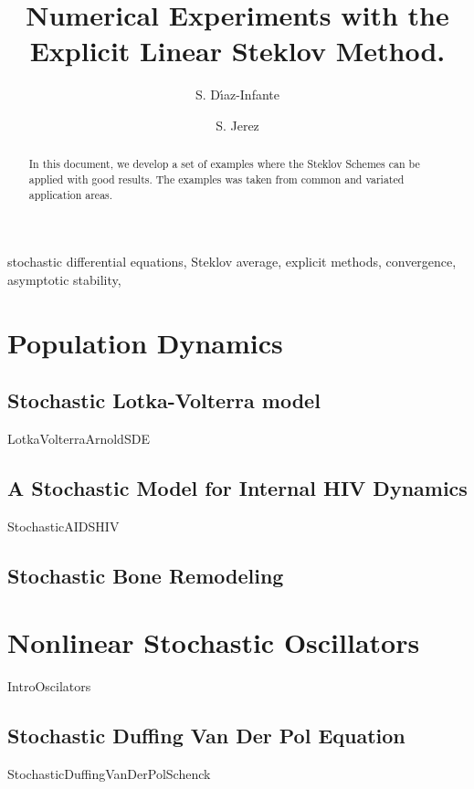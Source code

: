 \documentclass[1p, sort&compress, preprint, number]{elsarticle}
\begin{document}
	\begin{frontmatter}
		\title{
			Numerical Experiments with the Explicit Linear Steklov Method.
		}%
		\author[sj]{S. D\'{\i}az-Infante}
		\author[sj]{S. Jerez}
		\address[sj]{Split Step Linear Steklov Method 
		Department of Applied Mathematics, CIMAT, Guanajuato, Gto., Mexico,
		36240.
		}
		\begin{abstract}
			In this document, we develop a set of examples where the Steklov Schemes can be applied
			with good results. The examples was taken from common and variated application areas.
		\end{abstract}
		\begin{keyword}
			stochastic differential equations, Steklov average,
			explicit methods, convergence, asymptotic stability,
		\end{keyword}
	\end{frontmatter}
		\tableofcontents
		\pagebreak
%
	\section{Population  Dynamics}
		\subsection{Stochastic Lotka-Volterra model }
			{LotkaVolterraArnoldSDE}
		\subsection{A Stochastic Model for Internal HIV Dynamics}
			{StochasticAIDSHIV}
		\subsection{Stochastic Bone Remodeling}
	\section{Nonlinear Stochastic Oscillators}
		{IntroOscilators}
		\subsection{Stochastic Duffing Van Der Pol Equation}
			{StochasticDuffingVanDerPolSchenck}
\end{document}
